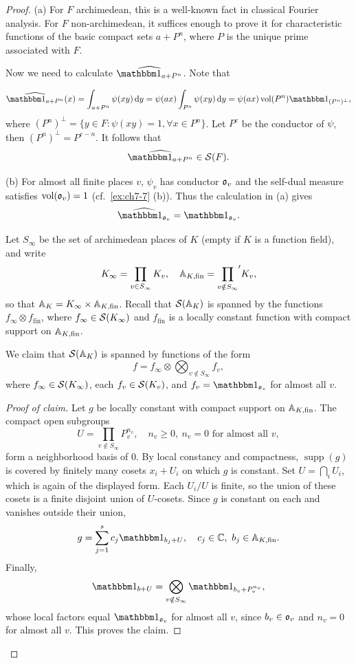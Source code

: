 \begin{proof}
(a) For $F$ archimedean, this is a well-known fact in classical Fourier analysis. For $F$
non-archimedean, it suffices enough to prove it for characteristic functions of the basic
compact sets $a + P^n$, where $P$ is the unique prime associated with $F$.

Now we need to calculate $\dual{\bbone_{a + P^n}}$. Note that

\[\dual{\bbone_{a + P^n}} (x) = \int_{a + P^n} \psi(xy) \dd y =
\psi(a x) \int_{P^n} \psi(x y) \dd y = \psi(a x) \vol(P^n) \bbone_{(P^n) ^ \bot}, \]
where $(P^n)^\bot = \{y \in F : \psi(x y) = 1, \forall x \in P^n \}$.
Let $P^c$ be the conductor of $\psi$, then $(P^n)^\bot = P^{c - n}$. It follows that
\[\dual{\bbone_{a+P^n}} \in \calS(F).   \]

(b) For almost all finite places $v$, $\psi_v$ has conductor $\mathfrak{o}_v$ and the self-dual measure
satisfies $\operatorname{vol}(\mathfrak{o}_v) = 1$ (cf.\ \cref{ex:ch7-7} (b)). Thus the calculation in (a) gives
\[\dual{\bbone_{\gotho_v}} = \bbone_{\gotho_v}. \]

Let $S_\infty$ be the set of archimedean places of $K$ (empty if $K$ is a function field), and write
\[K_\infty = \prod_{v \in S_\infty} K_v, \quad
\mathbb{A}_{K, \mathrm{fin}} = {\prod_{v \notin S_\infty}}' K_v, \]
so that $\mathbb{A}_K = K_\infty \times \mathbb{A}_{K, \mathrm{fin}}$. Recall that $\mathcal{S}(\mathbb{A}_K)$ is spanned by
the functions $f_\infty \otimes f_{\mathrm{fin}}$, where $f_\infty \in \mathcal{S}(K_\infty)$ and
$f_{\mathrm{fin}}$ is a locally constant function with compact support on $\mathbb{A}_{K, \mathrm{fin}}$.

We claim that $\mathcal{S}(\mathbb{A}_K)$ is spanned by functions of the form
\[f = f_\infty \otimes \bigotimes_{v \notin S_\infty} f_v, \]
where $f_\infty \in \mathcal{S}(K_\infty)$, each $f_v \in \mathcal{S}(K_v)$, and
$f_v = \bbone_{\gotho_v}$ for almost all $v$.

\begin{proof}[Proof of claim]
Let $g$ be locally constant with compact support on $\mathbb{A}_{K, \mathrm{fin}}$. The compact open subgroups
\[U = \prod_{v \notin S_\infty} P_v^{n_v}, \quad n_v \ge 0, \ n_v = 0 \text{ for almost all } v, \]
form a neighborhood basis of $0$. By local constancy and compactness, $\operatorname{supp}(g)$ is
covered by finitely many cosets $x_i + U_i$ on which $g$ is constant. Set $U = \bigcap_i U_i$,
which is again of the displayed form. Each $U_i/U$ is finite, so the union of these cosets is a
finite disjoint union of $U$-cosets. Since $g$ is constant on each and vanishes outside their union,
\[g = \sum_{j = 1}^{s} c_j \bbone_{b_j + U}, \quad c_j \in \CC, \ b_j \in \AAA_{K, \mathrm{fin}}. \]
Finally,
\[\bbone_{b + U} = \bigotimes_{v \notin S_\infty} \bbone_{b_v + P_v^{n_v}}, \]
whose local factors equal $\bbone_{\gotho_v}$ for almost all $v$, since $b_v \in \mathfrak{o}_v$ and
$n_v = 0$ for almost all $v$. This proves the claim.
\end{proof}


\end{proof}
